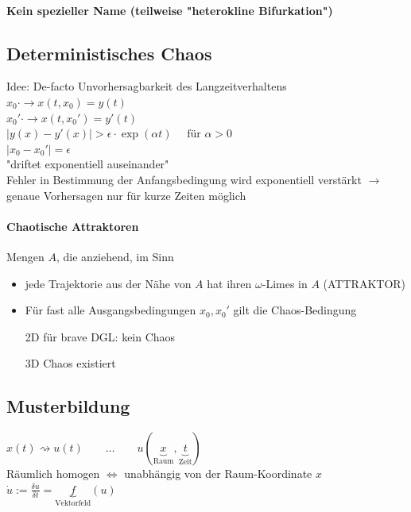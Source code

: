 \paragraph{Kein spezieller Name (teilweise "heterokline Bifurkation")}

\subsection{Deterministisches Chaos}
Idee: De-facto Unvorhersagbarkeit des Langzeitverhaltens
$ x_0 \cdot \rightarrow x(t, x_0) = y(t) $ \\
$ x_0' \cdot \rightarrow x(t, x_0') = y'(t) $ \\
$ | y(x) - y'(x) | > \epsilon \cdot \exp(\alpha t) \quad \text{ für } \alpha > 0 $ \\
$ | x_0 - x_0' | = \epsilon $ \\
"driftet exponentiell auseinander" \\
Fehler in Bestimmung der Anfangsbedingung wird exponentiell verstärkt $\rightarrow$ genaue Vorhersagen nur für kurze Zeiten möglich
\paragraph{Chaotische Attraktoren}
Mengen $A$, die anziehend, im Sinn \\
\begin{itemize}
    \item jede Trajektorie aus der Nähe von $A$ hat ihren $\omega$-Limes in $A$ (ATTRAKTOR)
    \item Für fast alle Ausgangsbedingungen $x_0, x_0'$ gilt die Chaos-Bedingung
    \item[2D] für brave DGL: kein Chaos
    \item[3D] Chaos existiert
\end{itemize}

\subsection{Musterbildung}
$ x(t) \rightsquigarrow u(t) \qquad \dots \qquad u(\underbrace{x}_{\text{Raum}}, \underbrace{t}_{\text{Zeit}}) $ \\
Räumlich homogen $\Leftrightarrow$ unabhängig von der Raum-Koordinate $x$ \\
$ \dot{u} := \frac{\delta u}{\delta t} = \underbrace{f}_{\text{Vektorfeld}}(u) $

